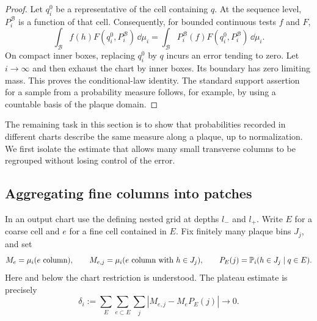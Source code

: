 \begin{proof}
Let $q_i^0$ be a representative of the cell containing $q$. At the
sequence level, $P^{\mathcal B}_{i}$ is a function of that cell.
Consequently, for bounded continuous tests $f$ and $F$,
\[
 \int_{\mathcal B} f(h)F(q_i^0,P^{\mathcal B}_{i})\,\dd\mu_i
 =\int_{\mathcal B}P^{\mathcal B}_{i}(f)
                  F(q_i^0,P^{\mathcal B}_{i})\,\dd\mu_i.
\]
On compact inner boxes, replacing $q_i^0$ by $q$ incurs an error
tending to zero. Let $i\to\infty$ and then exhaust the chart by
inner boxes. Its boundary has zero limiting mass. This proves the
conditional-law identity. The standard support assertion for a
sample from a probability measure follows, for example, by using a
countable basis of the plaque domain.
\end{proof}

The remaining task in this section is to show that probabilities
recorded in different charts describe the same measure along a
plaque, up to normalization. We first isolate the estimate that
allows many small transverse columns to be regrouped without losing
control of the error.

\subsection{Aggregating fine columns into patches}

In an output chart use the defining nested grid at depths $l_-$ and
$l_+$. Write $E$ for a coarse cell and $e$ for a fine cell contained
in $E$. Fix finitely many plaque bins $J_j$, and set
\[
 M_e=\mu_i(\text{$e$ column}),\qquad
 M_{e,j}=\mu_i(\text{$e$ column with }h\in J_j),\qquad
 P_E(j)=\mathbb P_i(h\in J_j\mid q\in E).
\]
Here and below the chart restriction is understood. The plateau
estimate is precisely
\begin{equation}\label{eq:mass-error}
 \delta_i:=\sum_E\sum_{e\subset E}\sum_j
          |M_{e,j}-M_eP_E(j)|\longrightarrow0.
\end{equation}

